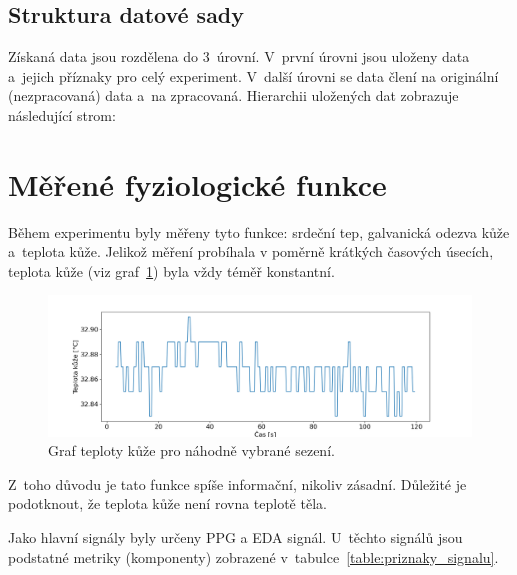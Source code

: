    
    \subsection{Struktura datové sady}
    Získaná data jsou rozdělena do 3~úrovní. V~první úrovni jsou uloženy data a~jejich příznaky pro celý experiment. V~další úrovni se data člení na originální (nezpracovaná) data a~na zpracovaná. Hierarchii uložených dat zobrazuje následující strom:
    
    \vspace{6mm}
    
    
    \section{Měřené fyziologické funkce}
    Během experimentu byly měřeny tyto funkce: srdeční tep, galvanická odezva kůže a~teplota kůže. Jelikož měření probíhala v poměrně krátkých časových úsecích, teplota kůže (viz graf~\ref{fig:temp}) byla vždy téměř konstantní.
    
    \begin{figure}[H]
        \centering
        \includegraphics[width=\textwidth]{obrazky-figures/temp.png}
        \caption{Graf teploty kůže pro náhodně vybrané sezení.}
        \label{fig:temp}
    \end{figure}
    
    Z~toho důvodu je tato funkce spíše informační, nikoliv zásadní. Důležité je podotknout, že teplota kůže není rovna teplotě těla.
    
    Jako hlavní signály byly určeny PPG a EDA signál. U~těchto signálů jsou podstatné metriky (komponenty) zobrazené v~tabulce~\ref{table:priznaky_signalu}.  
    
